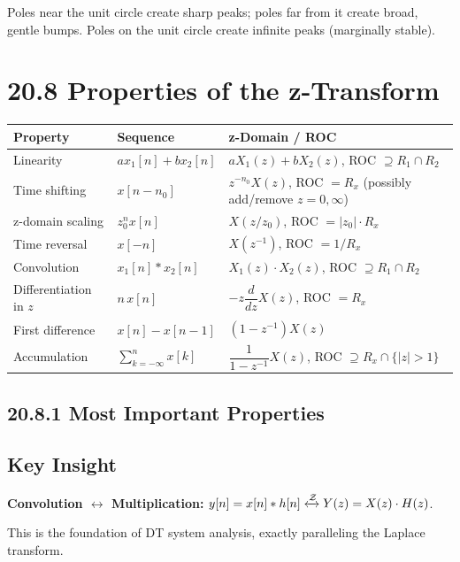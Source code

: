 \documentclass[11pt]{article}
\begin{document}
Poles near the unit circle create sharp peaks; poles far from it create broad, gentle bumps. Poles on the unit circle create infinite peaks (marginally stable).

\section*{20.8 Properties of the z-Transform}

\begin{center}
\begin{tabular}{|l|l|l|}
\hline
\textbf{Property} & \textbf{Sequence} & \textbf{z-Domain / ROC} \\
\hline
Linearity & $a x_1[n] + b x_2[n]$ & $a X_1(z) + b X_2(z)$, ROC $\supseteq R_1 \cap R_2$ \\
\hline
Time shifting & $x[n - n_0]$ & $z^{-n_0} X(z)$, ROC $= R_x$ (possibly add/remove $z = 0, \infty$) \\
\hline
z-domain scaling & $z_0^n x[n]$ & $X(z/z_0)$, ROC $= |z_0| \cdot R_x$ \\
\hline
Time reversal & $x[-n]$ & $X(z^{-1})$, ROC $= 1/R_x$ \\
\hline
Convolution & $x_1[n] * x_2[n]$ & $X_1(z) \cdot X_2(z)$, ROC $\supseteq R_1 \cap R_2$ \\
\hline
Differentiation in $z$ & $n \, x[n]$ & $-z \dfrac{d}{dz} X(z)$, ROC $= R_x$ \\
\hline
First difference & $x[n] - x[n-1]$ & $(1 - z^{-1}) X(z)$ \\
\hline
Accumulation & $\displaystyle\sum_{k=-\infty}^{n} x[k]$ & $\dfrac{1}{1 - z^{-1}} X(z)$, ROC $\supseteq R_x \cap \{|z| > 1\}$ \\
\hline
\end{tabular}
\end{center}

\subsection*{20.8.1 Most Important Properties}

\subsection*{Key Insight}

\textbf{Convolution $\leftrightarrow$ Multiplication:} $y[n] = x[n] * h[n] \xleftrightarrow{\mathcal{Z}} Y(z) = X(z) \cdot H(z)$.

This is the foundation of DT system analysis, exactly paralleling the Laplace transform.
\end{document}
